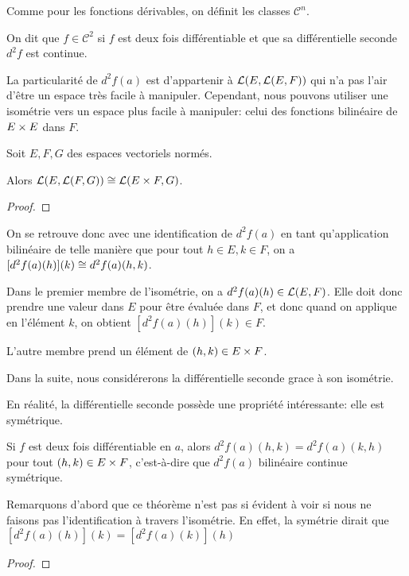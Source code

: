 Comme pour les fonctions dérivables, on définit les classes $\mathcal{C}^{n}$.

\begin{definition}
	On dit que $f \in \mathcal{C}^{2}$ si $f$ est deux fois différentiable et
	que sa différentielle seconde $d^{2}f$ est continue.
\end{definition}

La particularité de $d^{2}f(a)$ est d'appartenir à
$\mathcal{L}(E, \mathcal{L}(E, F))$ qui n'a pas l'air d'être un espace
très facile à manipuler. Cependant, nous pouvons utiliser une isométrie vers un
espace plus facile à manipuler: celui des fonctions bilinéaire de $E \times
E$ dans $F$.

\begin{proposition}
	Soit $E, F, G$ des espaces vectoriels normés.

	Alors $\mathcal{L}(E, \mathcal{L}(F, G)) \cong
	\mathcal{L}(E \times F, G)$.
\end{proposition}

\begin{proof}
	
\end{proof}

On se retrouve donc avec une identification de $d^{2}f(a)$ en tant
qu'application bilinéaire de telle manière que pour tout $h \in E, k \in F$, on
a $[d^{2}f(a)(h)](k) \cong d^{2}f(a)(h, k)$.

Dans le premier membre de l'isométrie, on a $d^{2}f(a)(h) \in
\mathcal{L}(E, F)$. Elle doit donc prendre une valeur dans $E$ pour être
évaluée dans $F$, et donc quand on applique en l'élément $k$, on obtient
$[d^{2}f(a)(h)](k) \in F$.

L'autre membre prend un élément de $(h, k) \in E \times F$.

Dans la suite, nous considérerons la différentielle seconde grace à son
isométrie.

En réalité, la différentielle seconde possède une propriété intéressante: elle
est symétrique.

\begin{theorem}
	\label{theorem_schwarz}

	Si $f$ est deux fois différentiable en $a$, alors $d^{2}f(a)(h, k) =
	d^{2}f(a)(k, h)$ pour tout $(h, k) \in E \times F$, c'est-à-dire que
	$d^{2}f(a)$ bilinéaire continue symétrique.
\end{theorem}

Remarquons d'abord que ce théorème n'est pas si évident à voir si nous ne
faisons pas l'identification à travers l'isométrie. En effet, la symétrie dirait
que $[d^{2}f(a)(h)](k) = [d^{2}f(a)(k)](h)$

\begin{proof}
	
\end{proof}
